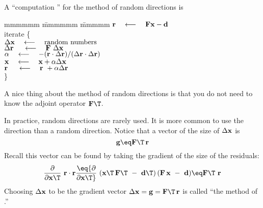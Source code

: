 \par
A ``computation '' for the method of random directions is
\def\padarrow{\quad\longleftarrow\quad}
\label{lsq/'randtemplate'}
\begin{tabbing}
mmmmmm \= mmmmmm \= mmmmm \kill
\> $\bold r \padarrow \bold F \bold x - \bold d$ \\
\> {\rm iterate \{ }                                                    \\
\>      \>  $\Delta \bold x   \padarrow {\rm random\ numbers}$          \\
\>      \>  $\Delta \bold r\  \padarrow \bold F \  \Delta \bold x$      \\
\>      \> $\alpha \padarrow
                -(       \bold r \cdot \Delta\bold r )/
                 (\Delta \bold r \cdot \Delta\bold r )
                $
                \\
\>      \> $\bold x   \padarrow \bold x   + \alpha\Delta \bold x$       \\
\>      \> $\bold r\  \padarrow \bold r\  + \alpha\Delta \bold r$       \\
\>      \> \}                                                   
\end{tabbing}
A nice thing about the method of random directions is that you
do not need to know the adjoint operator $\bold F\T$.

\par
In practice, random directions are rarely used.
It is more common to use the  direction than a random direction.
Notice that a vector of the size of $\Delta \bold x$ is
\begin{equation}
\bold g \eq  \bold F\T\,\bold r
\end{equation}
Recall this vector can be found by taking the gradient
of the size of the residuals:
\begin{equation}
{\partial \over  \partial \bold x\T }  \ \bold r \cdot \bold r
\eq
{\partial \over  \partial \bold x\T }  \ 
( \bold x\T \, \bold F\T  \ -\  \bold d\T) \,
( \bold F  \, \bold x   \ -\  \bold d)
\eq
\bold F\T \  \bold r
\end{equation}
Choosing $\Delta \bold x$ to be the gradient vector
$\Delta\bold x = \bold g = \bold F\T\,\bold r$
is called ``the method of .''

